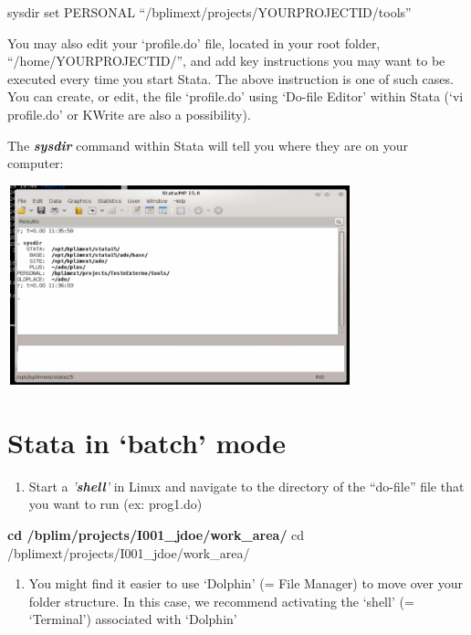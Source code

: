 \documentclass[]{book}
\providecommand{\tightlist}{%
  \setlength{\itemsep}{0pt}\setlength{\parskip}{0pt}}
\begin{document}
sysdir set PERSONAL ``/bplimext/projects/YOURPROJECTID/tools''

You may also edit your `profile.do' file, located in your root folder,
``/home/YOURPROJECTID/'', and add key instructions you may want to be
executed every time you start Stata. The above instruction is one of
such cases. You can create, or edit, the file `profile.do' using
`Do-file Editor' within Stata (`vi profile.do' or KWrite are also a
possibility).

The \textbf{\emph{sysdir}} command within Stata will tell you where they are on
your computer:

\includegraphics[width=3.93681in,height=2.27514in]{./media/image13.png}

\hypertarget{stata-in-batch-mode}{%
\section{\texorpdfstring{{Stata in `batch' mode}}{Stata in `batch' mode}}\label{stata-in-batch-mode}}

\begin{enumerate}
\def\labelenumi{\arabic{enumi}.}
\tightlist
\item
  Start a \emph{'\textbf{shell}'} in Linux and navigate to the directory
  of the ``do-file'' file that you want to run (ex: prog1.do)
\end{enumerate}

\textbf{cd /bplim/projects/I001\_jdoe/work\_area/} cd
/bplimext/projects/I001\_jdoe/work\_area/

\begin{enumerate}
\def\labelenumi{\arabic{enumi}.}
\setcounter{enumi}{1}
\tightlist
\item
  You might find it easier to use `Dolphin' (= File Manager) to move
  over your folder structure. In this case, we recommend activating
  the `shell' (= `Terminal') associated with `Dolphin'
\end{enumerate}
\end{document}
